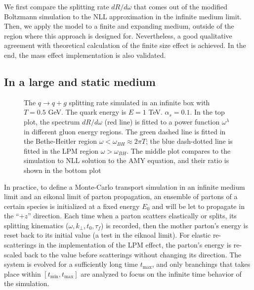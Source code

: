 We first compare the splitting rate $dR/d\omega$ that comes out of the modified Boltzmann simulation to the NLL approximation in the infinite medium limit.
Then, we apply the model to a finite and expanding medium, outside of the region where this approach is designed for.
Nevertheless, a good qualitative agreement with theoretical calculation of the finite size effect is achieved.
In the end, the mass effect implementation is also validated.

\subsection{In a large and static medium}
\begin{figure}
\caption{The $q\rightarrow q+g$ splitting rate simulated in an infinite box with $T=0.5$ GeV. The quark energy is $E=1$ TeV. $\alpha_s = 0.1$. In the top plot, the spectrum $dR/d\omega$ (red line) is fitted to a power function $\omega^\lambda$ in different gluon energy regions. The green dashed line is fitted in the Bethe-Heitler region $\omega < \omega_{BH}\approx 2\pi T$; the blue dash-dotted line is fitted in the LPM region $\omega > \omega_{BH}$. The middle plot compares to the simulation to NLL solution to the AMY equation, and their ratio is shown in the bottom plot}
\label{fig:spectrum}
\end{figure}

In practice, to define a Monte-Carlo transport simulation in an infinite medium limit and an eikonal limit of parton propagation, an ensemble of partons of a certain species is initialized at a fixed energy $E_0$ and will be let to propagate in the ``$+z$'' direction.
Each time when a parton scatters elastically or splits, its splitting kinematics ($\omega, k_\perp, t_0, \tau_f$) is recorded, then the mother parton's energy is reset back to its initial value (a test in the eiknoal limit).
For elastic re-scatterings in the implementation of the LPM effect, the parton's energy is re-scaled back to the value before scatterings without changing its direction.
The system is evolved for a sufficiently long time $t_{\max}$, and only branchings that takes place within $[t_{\min}, t_{\max}]$ are analyzed to focus on the infinite time behavior of the simulation.

